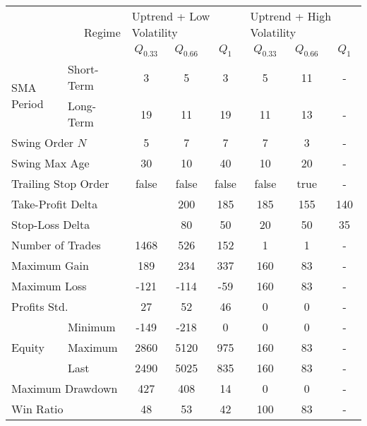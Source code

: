 \centering
\begin{tabular}{ll|cccccc}
    \toprule
    \multicolumn{2}{r|}{\multirow{2}{*}{Regime}} & \multicolumn{3}{l}{Uptrend + Low Volatility}     & \multicolumn{3}{l}{Uptrend + High Volatility}     \\
    \multicolumn{2}{r|}{} & $Q_{0.33}$ & $Q_{0.66}$ & $Q_{1}$ & $Q_{0.33}$ & $Q_{0.66}$ & $Q_{1}$ \\
    \midrule
    \multirow{2}{*}{SMA Period}            & Short-Term & 3    & 5    & 3   & 5   & 11  & - \\
    & Long-Term  & 19   & 11   & 19  & 11  & 13  & - \\
    \multicolumn{2}{l|}{Swing Order $N$} & 5 & 7 & 7 & 7 & 3 & - \\
    \multicolumn{2}{l|}{Swing Max Age} & 30 & 10 & 40 & 10 & 20 & - \\
    \multicolumn{2}{l|}{Trailing Stop Order} & false & false & false & false & true & - \\
    \multicolumn{2}{l|}{Take-Profit Delta} &            & 200  & 185  & 185 & 155 & 140 & - \\
    \multicolumn{2}{l|}{Stop-Loss Delta}   &            & 80   & 50   & 20  & 50  & 35  & - \\
    \midrule
    \multicolumn{2}{l|}{Number of Trades} & 1468 & 526 & 152 & 1 & 1 & - \\
    \multicolumn{2}{l|}{Maximum Gain} & 189 & 234 & 337 & 160 & 83 & - \\
    \multicolumn{2}{l|}{Maximum Loss} & -121 & -114 & -59 & 160 & 83 & - \\
    \multicolumn{2}{l|}{Profits Std.} & 27 & 52 & 46 & 0 & 0 & - \\
    \multirow{3}{*}{Equity}                & Minimum    & -149 & -218 & 0   & 0   & 0   & - \\
    & Maximum    & 2860 & 5120 & 975 & 160 & 83  & - \\
    & Last       & 2490 & 5025 & 835 & 160 & 83  & - \\
    \multicolumn{2}{l|}{Maximum Drawdown} & 427 & 408 & 14 & 0 & 0 & - \\
    \multicolumn{2}{l|}{Win Ratio} & 48 & 53 & 42 & 100 & 83 & - \\
    \bottomrule
\end{tabular}